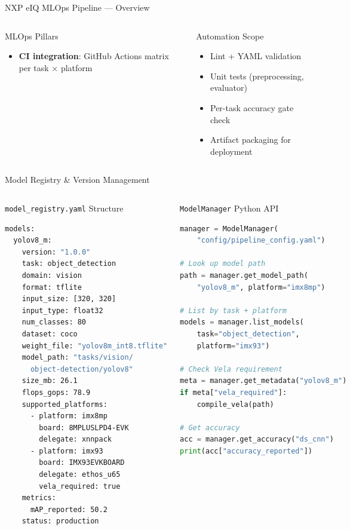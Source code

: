 \documentclass[aspectratio=169]{beamer}
\begin{document}
\begin{frame}{NXP eIQ MLOps Pipeline — Overview}
\begin{columns}[T]
\begin{block}{MLOps Pillars}
\begin{itemize}
          \item \textbf{CI integration}: GitHub Actions matrix per task $\times$ platform
        \end{itemize}
      \end{block}
      \begin{block}{Automation Scope}
        \begin{itemize}\scriptsize
          \item Lint + YAML validation
          \item Unit tests (preprocessing, evaluator)
          \item Per-task accuracy gate check
          \item Artifact packaging for deployment
        \end{itemize}
      \end{block}
  \end{columns}
\end{frame}

\begin{frame}[fragile]{Model Registry \& Version Management}
  \begin{columns}[T]
      \begin{block}{\texttt{model\_registry.yaml} Structure}
        \begin{lstlisting}[language=bash]
models:
  yolov8_m:
    version: "1.0.0"
    task: object_detection
    domain: vision
    format: tflite
    input_size: [320, 320]
    input_type: float32
    num_classes: 80
    dataset: coco
    weight_file: "yolov8m_int8.tflite"
    model_path: "tasks/vision/
      object-detection/yolov8"
    size_mb: 26.1
    flops_gops: 78.9
    supported_platforms:
      - platform: imx8mp
        board: 8MPLUSLPD4-EVK
        delegate: xnnpack
      - platform: imx93
        board: IMX93EVKBOARD
        delegate: ethos_u65
        vela_required: true
    metrics:
      mAP_reported: 50.2
    status: production
        \end{lstlisting}
      \end{block}
      \begin{block}{\texttt{ModelManager} Python API}
        \begin{lstlisting}[language=python]
manager = ModelManager(
    "config/pipeline_config.yaml")

# Look up model path
path = manager.get_model_path(
    "yolov8_m", platform="imx8mp")

# List by task + platform
models = manager.list_models(
    task="object_detection",
    platform="imx93")

# Check Vela requirement
meta = manager.get_metadata("yolov8_m")
if meta["vela_required"]:
    compile_vela(path)

# Get accuracy
acc = manager.get_accuracy("ds_cnn")
print(acc["accuracy_reported"])
        \end{lstlisting}
      \end{block}
  \end{columns}
\end{frame}
\end{document}

